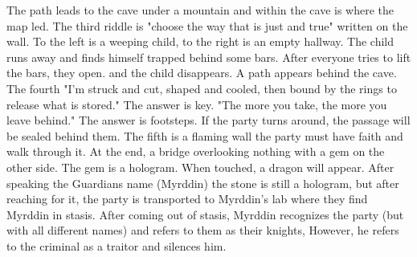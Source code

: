 The path leads to the cave under a mountain and within the cave is where the map led. The third riddle is "choose the way that is just and true" written on the wall. To the left is a weeping child, to the right is an empty hallway. The child runs away and finds himself trapped behind some bars. After everyone tries to lift the bars, they open. and the child disappears. A path appears behind the cave. The fourth "I'm struck and cut, shaped and cooled, then bound by the rings to release what is stored." The answer is key. "The more you take, the more you leave behind." The answer is footsteps. If the party turns around, the passage will be sealed behind them. The fifth is a flaming wall the party must have faith and walk through it. At the end, a bridge overlooking nothing with a gem on the other side. The gem is a hologram. When touched, a dragon will appear. After speaking the Guardians name (Myrddin) the stone is still a hologram, but after reaching for it, the party is transported to Myrddin’s lab where they find Myrddin in stasis. After coming out of stasis, Myrddin recognizes the party (but with all different names) and refers to them as their knights, However, he refers to the criminal as a traitor and silences him.
